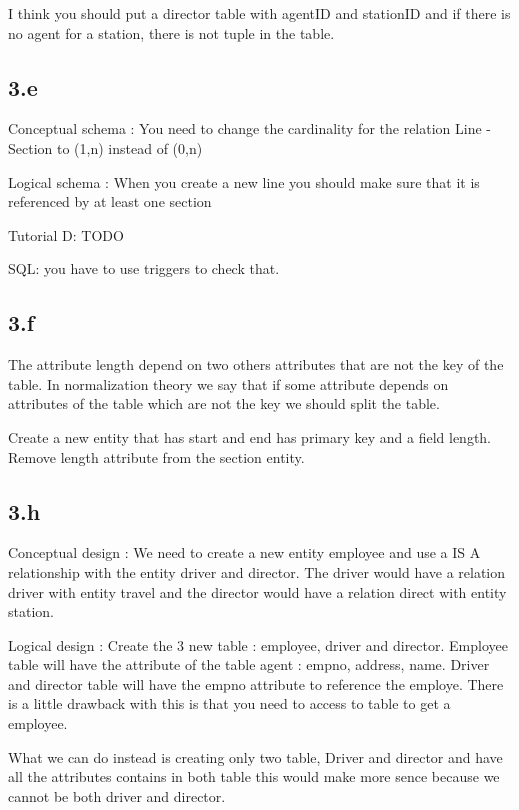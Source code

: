 \documentclass[a4paper, 12pt]{article}
\begin{document}
I think you should put a director table with agentID and stationID and if there is no agent for a station, there is not tuple in the table.


\subsection{3.e}

Conceptual schema : You need to change the cardinality for the relation Line - Section to (1,n) instead of (0,n)

Logical schema : When you create a new line you should make sure that it is referenced by at least one section

Tutorial D: TODO

SQL: you have to use triggers to check that.

\subsection{3.f}

The attribute length depend on two others attributes that are not the key of the table. In normalization theory we say that if some attribute depends on attributes of the table which are not the key we should split the table.

Create a new entity that has start and end has primary key and a field length. 	Remove length attribute from the section entity.

\subsection{3.h}

Conceptual design : We need to create a new entity employee and use a IS A relationship with the entity driver and director. The driver would have a relation driver with entity travel and the director would have a relation direct with entity station.

Logical design : Create the 3 new table : employee, driver and director. Employee table will have the attribute of the table agent : empno, address, name. Driver and director table will have the empno attribute to reference the employe. There is a little drawback with this is that you need to access to table to get a employee. 

What we can do instead is creating only two table, Driver and director and have all the attributes contains in both table this would make more sence because we cannot be both driver and director.
\end{document}
